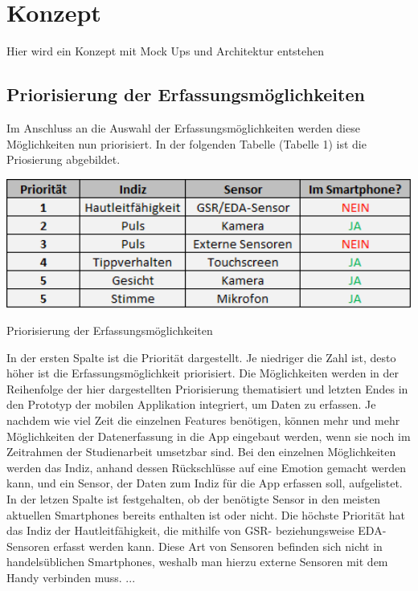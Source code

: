 \section{Konzept}
Hier wird ein Konzept mit Mock Ups und Architektur entstehen

\subsection{Priorisierung der Erfassungsmöglichkeiten}
Im Anschluss an die Auswahl der Erfassungsmöglichkeiten werden diese Möglichkeiten nun priorisiert. In der folgenden Tabelle (Tabelle 1) ist die Priosierung abgebildet. \newline
\begin{table}[h]
	\centering
	\includegraphics[width=14cm]{Bilder/prio.png}
	\caption[Priorisierung der Erfassungsmöglichkeiten]{Priorisierung der Erfassungsmöglichkeiten}
\end{table}%
\newline In der ersten Spalte ist die Priorität dargestellt. Je niedriger die Zahl ist, desto höher ist die Erfassungsmöglichkeit priorisiert. Die Möglichkeiten werden in der Reihenfolge der hier dargestellten Priorisierung thematisiert und letzten Endes in den Prototyp der mobilen Applikation integriert, um Daten zu erfassen. Je nachdem wie viel Zeit die einzelnen Features benötigen, können mehr und mehr Möglichkeiten der Datenerfassung in die App eingebaut werden, wenn sie noch im Zeitrahmen der Studienarbeit umsetzbar sind. Bei den einzelnen Möglichkeiten werden das Indiz, anhand dessen Rückschlüsse auf eine Emotion gemacht werden kann, und ein Sensor, der Daten zum Indiz für die App erfassen soll, aufgelistet. In der letzen Spalte ist festgehalten, ob der benötigte Sensor in den meisten aktuellen Smartphones bereits enthalten ist oder nicht. \newline
Die höchste Priorität hat das Indiz der Hautleitfähigkeit, die mithilfe von GSR- beziehungsweise EDA-Sensoren erfasst werden kann. Diese Art von Sensoren befinden sich nicht in handelsüblichen Smartphones, weshalb man hierzu externe Sensoren mit dem Handy verbinden muss. \newline
...

